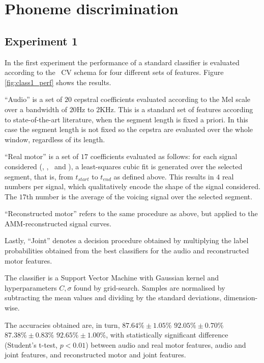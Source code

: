 \section{Phoneme discrimination}
\label{sec:class}

\subsection{Experiment 1}
\label{subsec:exp1}

In the first experiment the performance of a standard classifier is evaluated
according to the \overall\ CV schema for four different sets of features.
Figure \ref{fig:class1_perf} shows the results.

``Audio'' is a set of $20$ cepstral coefficients evaluated according to the
Mel scale over a bandwidth of $20$Hz to $2$KHz. This is a standard set of features
according to state-of-the-art literature, when the segment
length is fixed a priori. In this case the segment length is not fixed so the
cepstra are evaluated over the whole window, regardless of its length.

%
%

``Real motor'' is a set of $17$ coefficients evaluated as follows: for each
signal considered (\vlio, \alio, \vttu\ and \attu), a least-squares cubic fit
is generated over the selected segment, that is, from $t_{start}$ to $t_{end}$
as defined above. This results in $4$ real numbers
per signal, which qualitatively encode the shape of the signal considered. The
$17$th number is the average of the voicing signal over the selected segment.

``Reconstructed motor'' refers to the same procedure as above, but applied
to the AMM-reconstructed signal curves.

Lastly, ``Joint'' denotes a decision procedure obtained by multiplying the
label probabilities obtained from the best classifiers for the audio and
reconstructed motor features.

The classifier is a Support Vector Machine \cite{BGV92} with Gaussian kernel
and hyperparameters $C, \sigma$ found by grid-search. Samples are normalised
by subtracting the mean values and dividing by the standard deviations,
dimension-wise.

The accuracies obtained are, in turn,
$87.64\% \pm 1.05\%$
$92.05\% \pm 0.70\%$
$87.38\% \pm 0.83\%$
$92.65\% \pm 1.00\%$, with statistically significant difference (Student's t-test,
$p<0.01$) between audio and real motor features, audio and joint features, and
reconstructed motor and joint features.

